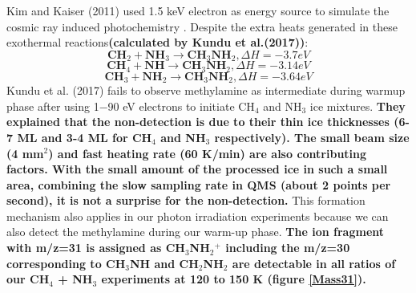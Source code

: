 Kim and Kaiser (2011) used 1.5 keV electron as energy source to simulate the cosmic ray induced photochemistry \cite{kim}. Despite the extra heats generated in these exothermal reactions\textbf{(calculated by Kundu et al.(2017)\cite{kundu2017electron})}:
\begin{equation}
\textbf{CH$_2$} + \textbf{NH$_3$} \rightarrow \textbf{CH$_3$NH$_2$}, \Delta H = -3.7 eV
\label{eq:methylamine_1}
\end{equation}
\begin{equation}
\textbf{CH$_4$} + \textbf{NH} \rightarrow \textbf{CH$_3$NH$_2$}, \Delta H = -3.14 eV
\label{eq:methylamine_2}
\end{equation}
\begin{equation}
\textbf{CH$_3$} + \textbf{NH$_2$} \rightarrow \textbf{CH$_3$NH$_2$}, \Delta H = -3.64 eV
\label{eq:methylamine_3}
\end{equation}
Kundu et al. (2017) \cite{kundu2017electron} fails to observe methylamine as intermediate during warmup phase after using 1$-$90 eV electrons to initiate CH$_4$ and NH$_3$ ice mixtures. \textbf{They explained that the non-detection is due to their thin ice thicknesses (6-7 ML and 3-4 ML for CH$_4$ and NH$_3$ respectively). The small beam size (4 mm$^2$) and fast heating rate (60 K/min) are also contributing factors. With the small amount of the processed ice in such a small area, combining the slow sampling rate in QMS (about 2 points per second), it is not a surprise for the non-detection.} This formation mechanism also applies in our photon irradiation experiments because we can also detect the methylamine during our warm-up phase. \textbf{The ion fragment with m/z=31 is assigned as CH$_3$NH$_2$$^+$ including the m/z=30 corresponding to CH$_3$NH and CH$_2$NH$_2$ are detectable in all ratios of our CH$_4$ + NH$_3$ experiments at 120 to 150 K (figure \ref{Mass31}).}\\

